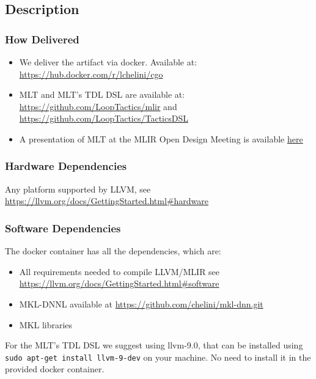 {%
\subsection{Description}

\subsubsection{How Delivered} 

\begin{itemize} 
\item We deliver the artifact via docker. Available at:
\url{https://hub.docker.com/r/lchelini/cgo}

\item MLT and MLT's TDL DSL are available at:
\url{https://github.com/LoopTactics/mlir} and
\url{https://github.com/LoopTactics/TacticsDSL}

\item A presentation of MLT at the MLIR Open Design Meeting is available
\href{https://drive.google.com/file/d/1mfvAiJck4WDDcSPaWbc3D_Dvh86pp3MD/edit}{here}

\end{itemize}

\subsubsection{Hardware Dependencies}

Any platform supported by LLVM, see
\url{https://llvm.org/docs/GettingStarted.html#hardware}

\subsubsection{Software Dependencies}

The docker container has all the dependencies, which are:

\begin{itemize}
\item All requirements needed to compile LLVM/MLIR see
  \url{https://llvm.org/docs/GettingStarted.html#software}
\item MKL-DNNL available at \url{https://github.com/chelini/mkl-dnn.git}
\item MKL libraries
\end{itemize}

\noindent For the MLT's TDL DSL we suggest using llvm-9.0, that can be installed
using \texttt{sudo apt-get install llvm-9-dev} on your machine. No need to install
it in the provided docker container.

}
